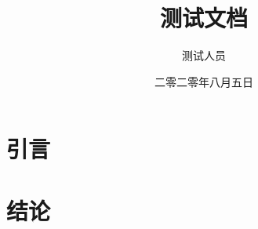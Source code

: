 \documentclass{article}
\title{测试文档}
\author{测试人员}
\date{二零二零年八月五日}
\begin{document}
\maketitle

\section{引言}
\label{sec:intro}

\section{结论}
\label{sec:conclusions}
\end{document}
